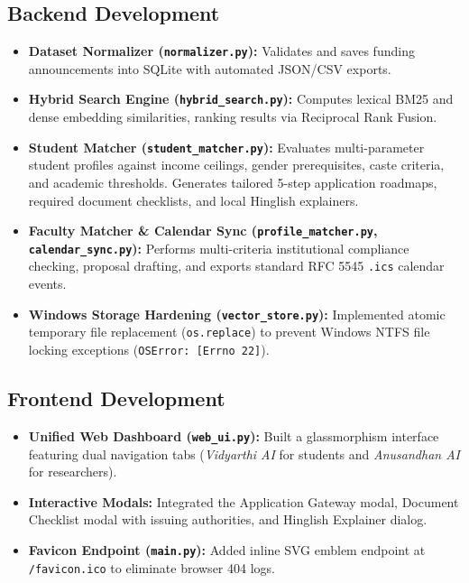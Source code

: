 \documentclass[12pt,a4paper]{article}
\begin{document}
\subsection{Backend Development}
\begin{itemize}[itemsep=2pt]
    \item \textbf{Dataset Normalizer (\texttt{normalizer.py}):} Validates and saves funding announcements into SQLite with automated JSON/CSV exports.
    \item \textbf{Hybrid Search Engine (\texttt{hybrid\_search.py}):} Computes lexical BM25 and dense embedding similarities, ranking results via Reciprocal Rank Fusion.
    \item \textbf{Student Matcher (\texttt{student\_matcher.py}):} Evaluates multi-parameter student profiles against income ceilings, gender prerequisites, caste criteria, and academic thresholds. Generates tailored 5-step application roadmaps, required document checklists, and local Hinglish explainers.
    \item \textbf{Faculty Matcher \& Calendar Sync (\texttt{profile\_matcher.py}, \texttt{calendar\_sync.py}):} Performs multi-criteria institutional compliance checking, proposal drafting, and exports standard RFC 5545 \texttt{.ics} calendar events.
    \item \textbf{Windows Storage Hardening (\texttt{vector\_store.py}):} Implemented atomic temporary file replacement (\texttt{os.replace}) to prevent Windows NTFS file locking exceptions (\texttt{OSError: [Errno 22]}).
\end{itemize}

\subsection{Frontend Development}
\begin{itemize}[itemsep=2pt]
    \item \textbf{Unified Web Dashboard (\texttt{web_ui.py}):} Built a glassmorphism interface featuring dual navigation tabs (\textit{Vidyarthi AI} for students and \textit{Anusandhan AI} for researchers).
    \item \textbf{Interactive Modals:} Integrated the Application Gateway modal, Document Checklist modal with issuing authorities, and Hinglish Explainer dialog.
    \item \textbf{Favicon Endpoint (\texttt{main.py}):} Added inline SVG emblem endpoint at \texttt{/favicon.ico} to eliminate browser 404 logs.
\end{itemize}
\end{document}
